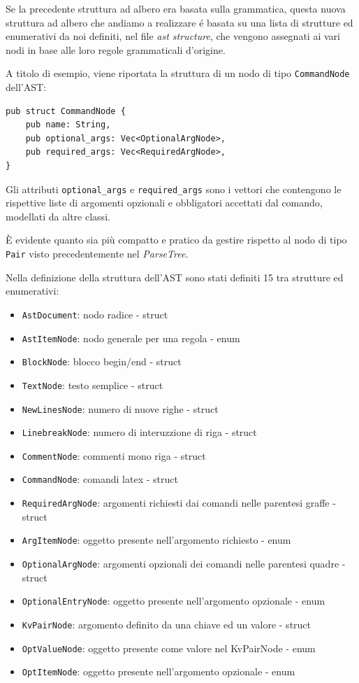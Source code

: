 \documentclass{article}
\begin{document}

    Se la precedente struttura ad albero era basata sulla grammatica, questa nuova struttura ad albero che andiamo a realizzare é basata su una lista di strutture ed enumerativi da noi definiti, nel file \textit{ast structure}, che vengono assegnati ai vari nodi in base alle loro regole grammaticali d'origine.

    A titolo di esempio, viene riportata la struttura di un nodo di tipo \texttt{CommandNode} dell'AST:
    \begin{verbatim}
pub struct CommandNode {
    pub name: String,
    pub optional_args: Vec<OptionalArgNode>,
    pub required_args: Vec<RequiredArgNode>,
}
    \end{verbatim}
    Gli attributi \texttt{optional\_args} e \texttt{required\_args} sono i vettori che contengono le rispettive liste di argomenti opzionali e obbligatori accettati dal comando, modellati da altre classi.

    È evidente quanto sia più compatto e pratico da gestire rispetto al nodo di tipo \texttt{Pair} visto precedentemente nel \textit{ParseTree}.

    Nella definizione della struttura dell'AST sono stati definiti 15 tra strutture ed enumerativi:
    \begin{itemize}
        \item \texttt{AstDocument}: nodo radice - struct
        \item \texttt{AstItemNode}: nodo generale per una regola - enum
        \item \texttt{BlockNode}: blocco begin/end - struct
        \item \texttt{TextNode}: testo semplice - struct
        \item \texttt{NewLinesNode}: numero di nuove righe - struct
        \item \texttt{LinebreakNode}: numero di interuzzione di riga - struct
        \item \texttt{CommentNode}: commenti mono riga - struct
        \item \texttt{CommandNode}: comandi latex - struct
        \item \texttt{RequiredArgNode}: argomenti richiesti dai comandi nelle parentesi graffe - struct
        \item \texttt{ArgItemNode}: oggetto presente nell'argomento richiesto - enum
        \item \texttt{OptionalArgNode}: argomenti opzionali dei comandi nelle parentesi quadre - struct
        \item \texttt{OptionalEntryNode}: oggetto presente nell'argomento opzionale - enum
        \item \texttt{KvPairNode}: argomento definito da una chiave ed un valore - struct
        \item \texttt{OptValueNode}: oggetto presente come valore nel KvPairNode - enum
        \item \texttt{OptItemNode}: oggetto presente nell'argomento opzionale - enum
    \end{itemize}
\end{document}
